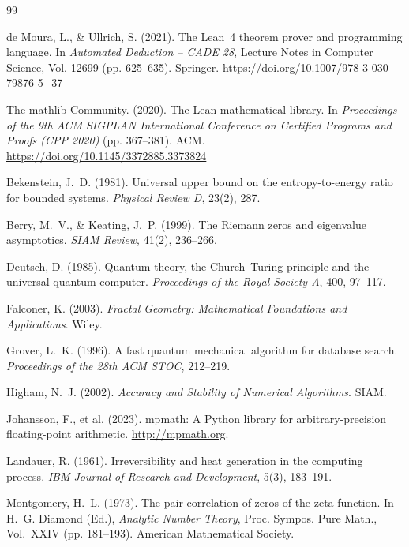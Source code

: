 \documentclass[12pt]{article}
\theoremstyle{lawstyle}
\theoremstyle{conjstyle}
\theoremstyle{predstyle}
\begin{document}
\begin{thebibliography}{99}

de Moura, L., \& Ullrich, S. (2021).
The Lean~4 theorem prover and programming language.
In \textit{Automated Deduction -- CADE 28}, Lecture Notes in Computer Science, Vol. 12699 (pp. 625--635). Springer.
\url{https://doi.org/10.1007/978-3-030-79876-5_37}

The mathlib Community. (2020).
The Lean mathematical library.
In \textit{Proceedings of the 9th ACM SIGPLAN International Conference on Certified Programs and Proofs (CPP 2020)} (pp. 367--381). ACM.
\url{https://doi.org/10.1145/3372885.3373824}

Bekenstein, J.~D. (1981).
Universal upper bound on the entropy-to-energy ratio for bounded systems.
\textit{Physical Review D}, 23(2), 287.

Berry, M.~V., \& Keating, J.~P. (1999).
The Riemann zeros and eigenvalue asymptotics.
\textit{SIAM Review}, 41(2), 236--266.

Deutsch, D. (1985).
Quantum theory, the Church--Turing principle and the universal quantum computer.
\textit{Proceedings of the Royal Society A}, 400, 97--117.

Falconer, K. (2003).
\textit{Fractal Geometry: Mathematical Foundations and Applications}.
Wiley.

Grover, L.~K. (1996).
A fast quantum mechanical algorithm for database search.
\textit{Proceedings of the 28th ACM STOC}, 212--219.

Higham, N.~J. (2002).
\textit{Accuracy and Stability of Numerical Algorithms}.
SIAM.

Johansson, F., et al. (2023).
mpmath: A Python library for arbitrary-precision floating-point arithmetic.
\url{http://mpmath.org}.

Landauer, R. (1961).
Irreversibility and heat generation in the computing process.
\textit{IBM Journal of Research and Development}, 5(3), 183--191.

Montgomery, H.~L. (1973).
The pair correlation of zeros of the zeta function.
In H.~G. Diamond (Ed.), \textit{Analytic Number Theory}, Proc. Sympos. Pure Math., Vol.~XXIV (pp. 181--193). American Mathematical Society.


\end{thebibliography}
\end{document}
